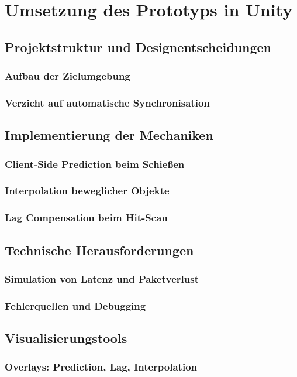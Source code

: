 \documentclass[12pt,a4paper]{article}
\begin{document}
\section{Umsetzung des Prototyps in Unity}
\subsection{Projektstruktur und Designentscheidungen}
\subsubsection{Aufbau der Zielumgebung}
\subsubsection{Verzicht auf automatische Synchronisation}
\subsection{Implementierung der Mechaniken}
\subsubsection{Client-Side Prediction beim Schießen}
\subsubsection{Interpolation beweglicher Objekte}
\subsubsection{Lag Compensation beim Hit-Scan}
\subsection{Technische Herausforderungen}
\subsubsection{Simulation von Latenz und Paketverlust}
\subsubsection{Fehlerquellen und Debugging}
\subsection{Visualisierungstools}
\subsubsection{Overlays: Prediction, Lag, Interpolation}
\end{document}
